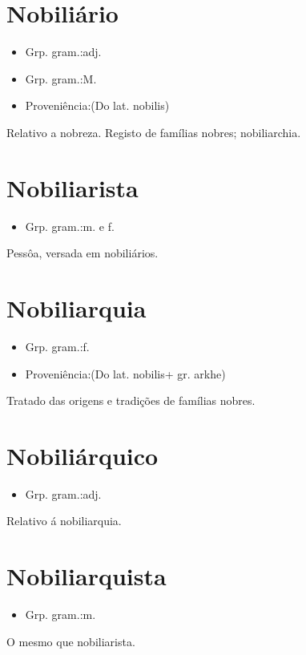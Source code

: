 \section{Nobiliário}
\begin{itemize}
\item {Grp. gram.:adj.}
\end{itemize}
\begin{itemize}
\item {Grp. gram.:M.}
\end{itemize}
\begin{itemize}
\item {Proveniência:(Do lat. \textunderscore nobilis\textunderscore )}
\end{itemize}
Relativo a nobreza.
Registo de famílias nobres; nobiliarchia.
\section{Nobiliarista}
\begin{itemize}
\item {Grp. gram.:m.  e  f.}
\end{itemize}
Pessôa, versada em nobiliários.
\section{Nobiliarquia}
\begin{itemize}
\item {Grp. gram.:f.}
\end{itemize}
\begin{itemize}
\item {Proveniência:(Do lat. \textunderscore nobilis\textunderscore  + gr. \textunderscore arkhe\textunderscore )}
\end{itemize}
Tratado das origens e tradições de famílias nobres.
\section{Nobiliárquico}
\begin{itemize}
\item {Grp. gram.:adj.}
\end{itemize}
Relativo á nobiliarquia.
\section{Nobiliarquista}
\begin{itemize}
\item {Grp. gram.:m.}
\end{itemize}
O mesmo que \textunderscore nobiliarista\textunderscore .
